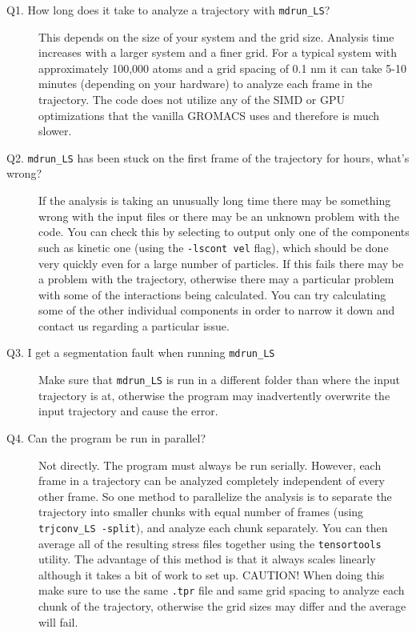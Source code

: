 \documentclass[10pt,letterpaper,notitlepage]{article}
\begin{document}
\begin{description}

\item[Q1. How long does it take to analyze a trajectory with \texttt{mdrun\_LS}?] This depends on the size of your system and the grid size. Analysis time increases with a larger system and a finer grid. For a typical system with approximately 100,000 atoms and a grid spacing of 0.1 nm it can take 5-10 minutes (depending on your hardware) to analyze each frame in the trajectory. The code does not utilize any of the SIMD or GPU optimizations that the vanilla GROMACS uses and therefore is much slower.

\item[Q2. \texttt{mdrun\_LS} has been stuck on the first frame of the trajectory for hours, what's wrong?] If the analysis is taking an unusually long time there may be something wrong with the input files or there may be an unknown problem with the code. You can check this by selecting to output only one of the components such as kinetic one (using the \texttt{-lscont vel} flag), which should be done very quickly even for a large number of particles. If this fails there may be a problem with the trajectory, otherwise there may a particular problem with some of the interactions being calculated. You can try calculating some of the other individual components in order to narrow it down and contact us regarding a particular issue.

\item[Q3. I get a segmentation fault when running \texttt{mdrun\_LS}] Make sure that \texttt{mdrun\_LS} is run in a different folder than where the input trajectory is at, otherwise the program may inadvertently overwrite the input trajectory and cause the error.

\item[Q4. Can the program be run in parallel? ] Not directly. The program must always be run serially. However, each frame in a trajectory can be analyzed completely independent of every other frame. So one method to parallelize the analysis is to separate the trajectory into smaller chunks with equal number of frames (using \texttt{trjconv\_LS -split}), and analyze each chunk separately. You can then average all of the resulting stress files together using the \texttt{tensortools} utility. The advantage of this method is that it always scales linearly although it takes a bit of work to set up. CAUTION! When doing this make sure to use the same \texttt{.tpr} file and same grid spacing to analyze each chunk of the trajectory, otherwise the grid sizes may differ and the average will fail.


\end{description}
\end{document}

